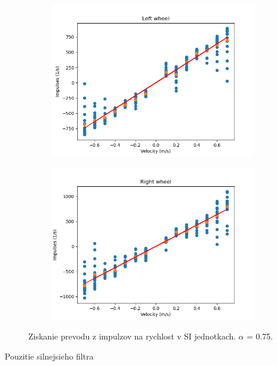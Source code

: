 \begin{figure}[!htbp]
	\begin{subfigure}{0.5\textwidth}
		\includegraphics[width=\textwidth]{img/lw_075250.png}
	\end{subfigure}
	\hfill
	\begin{subfigure}{0.5\textwidth}
		\includegraphics[width=\textwidth]{img/rw_075250.png}
	\end{subfigure}
	\caption{Ziskanie prevodu z impulzov na rychlost v SI jednotkach. \(\alpha\) = 0.75.}
	\label{fig:rw_lw_07250}
\end{figure}

Pouzitie silnejsieho filtra

